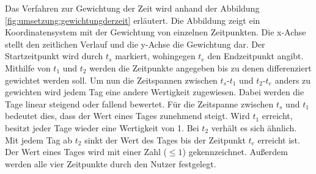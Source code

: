 Das Verfahren zur Gewichtung der Zeit wird anhand der Abbildung \ref{fig:umsetzung:gewichtungderzeit} erläutert. Die Abbildung zeigt ein Koordinatensystem mit der Gewichtung von einzelnen Zeitpunkten. Die x-Achse stellt den zeitlichen Verlauf und die y-Achse die Gewichtung dar. Der Startzeitpunkt wird durch $t_{s}$ markiert, wohingegen $t_{e}$ den Endzeitpunkt angibt. Mithilfe von $t_1$ und $t_2$ werden die Zeitpunkte angegeben bis zu denen differenziert gewichtet werden soll. Um nun die Zeitspannen zwischen $t_{s}$-$t_1$ und $t_2$-$t_{e}$ anders zu gewichten wird jedem Tag eine andere Wertigkeit zugewiesen. Dabei werden die Tage linear steigend oder fallend bewertet. Für die Zeitspanne zwischen $t_{s}$ und $t_1$ bedeutet dies, dass der Wert eines Tages zunehmend steigt. Wird $t_1$ erreicht, besitzt jeder Tage wieder eine Wertigkeit von 1. Bei $t_2$ verhält es sich ähnlich. Mit jedem Tag ab $t_2$ sinkt der Wert des Tages bis der Zeitpunkt $t_{e}$ erreicht ist. Der Wert eines Tages wird mit einer Zahl ($\le1$) gekennzeichnet. Außerdem werden alle vier Zeitpunkte durch den Nutzer festgelegt.  

